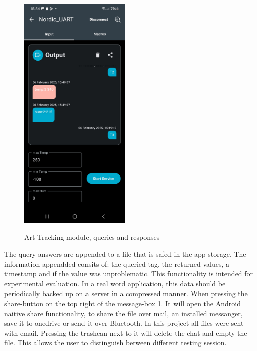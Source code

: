 \begin{figure}[ht!]
\centering
 \caption{Art Tracking module, queries and responses}
\includegraphics[width=200px]{graphics/nRF_toolbox_Bad_Value_2.jpg}
\label{f:Toolbox_art_filled}
\end{figure}


The query-answers are appended to a file that is safed in the app-storage.
The information appendded consits of: the queried tag, the returned values, a timestamp and if the value was unproblematic.
This functionality is intended for experimental evaluation. 
In a real word application, this data should be periodically backed up on a server in a compressed manner.
When pressing the share-button on the top right of the message-box \ref{f:Toolbox_art_filled}.
It will open the Android naitive share functionality, to share the file over mail, an installed messanger, save it to onedrive or send it over Bluetooth.
In this project all files were sent with email.
Pressing the trashcan next to it will delete the chat and empty the file.
This allows the user to distinguish between different testing session.